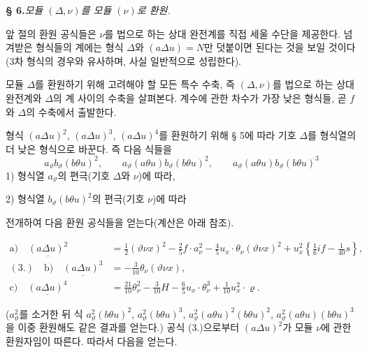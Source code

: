 \begin{center}
\textbf{§ 6.}\quad\emph{모듈 $(\Delta,\nu)$를 모듈 $(\nu)$로 환원.}
\end{center}

앞 절의 환원 공식들은 $\nu$를 법으로 하는 상대 완전계를 직접 세울 수단을 제공한다. 넘겨받은 형식들의 계에는 형식 $\Delta$와 $(a\Delta u)=N$만 덧붙이면 된다는 것을 보일 것이다(3차 형식의 경우와 유사하며, 사실 일반적으로 성립한다).

모듈 $\Delta$를 환원하기 위해 고려해야 할 모든 특수 수축, 즉 $(\Delta,\nu)$를 법으로 하는 상대 완전계와 $\Delta$의 계 사이의 수축을 살펴본다. 계수에 관한 차수가 가장 낮은 형식들, 곧 $f$와 $\Delta$의 수축에서 출발한다.

형식 $(a\Delta u)^2$, $(a\Delta u)^3$, $(a\Delta u)^4$를 환원하기 위해 § 5에 따라 기호 $\Delta$를 형식열의 더 낮은 형식으로 바꾼다. 즉 다음 식들을
\[
a_\vartheta b_\vartheta(b\theta u)^2,
\qquad a_\vartheta(a\theta u)b_\vartheta(b\theta u)^2,
\qquad a_\vartheta(a\theta u)b_\vartheta(b\theta u)^3
\]
1) 형식열 $a_\vartheta$의 편극(기호 $\Delta$와 $\nu$)에 따라,

2) 형식열 $b_\vartheta(b\theta u)^2$의 편극(기호 $\nu$)에 따라

전개하여 다음 환원 공식들을 얻는다(계산은 아래 참조).

\[
\begin{aligned}
\text{a)}\quad \underline{(a\Delta u)^2}
&=\frac12(\vartheta \nu x)^2-\frac25f\cdot a_\nu^2
-\frac45u_x\cdot\theta_\nu(\vartheta \nu x)^2
+u_x^2\left\{\frac16i f-\frac1{40}s\right\},\\
(3.)\quad\text{b)}\quad \underline{(a\Delta u)^3}
&=-\frac3{10}\theta_\nu(\vartheta \nu x),\\
\text{c)}\quad \underline{(a\Delta u)^4}
&=\frac{21}{10}\theta_\nu^2-\frac3{10}H
-\frac65u_x\cdot\theta_\nu^3+\frac1{10}u_x^2\cdot\varrho.
\end{aligned}
\]

($a_\vartheta^2$를 소거한 뒤 식 $a_\vartheta^2(b\theta u)^2$, $a_\vartheta^2(b\theta u)^3$, $a_\vartheta^2(a\theta u)^2(b\theta u)^2$, $a_\vartheta^2(a\theta u)(b\theta u)^3$을 이중 환원해도 같은 결과를 얻는다.)
공식 (3.)으로부터 $(a\Delta u)^2$가 모듈 $\nu$에 관한 환원자임이 따른다. 따라서 다음을 얻는다.

